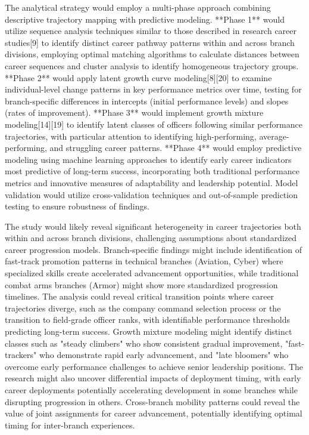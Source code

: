 \documentclass[main.tex]{subfiles}
\begin{document}

The analytical strategy would employ a multi-phase approach combining descriptive trajectory mapping with predictive modeling. **Phase 1** would utilize sequence analysis techniques similar to those described in research career studies[9] to identify distinct career pathway patterns within and across branch divisions, employing optimal matching algorithms to calculate distances between career sequences and cluster analysis to identify homogeneous trajectory groups. **Phase 2** would apply latent growth curve modeling[8][20] to examine individual-level change patterns in key performance metrics over time, testing for branch-specific differences in intercepts (initial performance levels) and slopes (rates of improvement). **Phase 3** would implement growth mixture modeling[14][19] to identify latent classes of officers following similar performance trajectories, with particular attention to identifying high-performing, average-performing, and struggling career patterns. **Phase 4** would employ predictive modeling using machine learning approaches to identify early career indicators most predictive of long-term success, incorporating both traditional performance metrics and innovative measures of adaptability and leadership potential. Model validation would utilize cross-validation techniques and out-of-sample prediction testing to ensure robustness of findings.


The study would likely reveal significant heterogeneity in career trajectories both within and across branch divisions, challenging assumptions about standardized career progression models. Branch-specific findings might include identification of fast-track promotion patterns in technical branches (Aviation, Cyber) where specialized skills create accelerated advancement opportunities, while traditional combat arms branches (Armor) might show more standardized progression timelines. The analysis could reveal critical transition points where career trajectories diverge, such as the company command selection process or the transition to field-grade officer ranks, with identifiable performance thresholds predicting long-term success. Growth mixture modeling might identify distinct classes such as "steady climbers" who show consistent gradual improvement, "fast-trackers" who demonstrate rapid early advancement, and "late bloomers" who overcome early performance challenges to achieve senior leadership positions. The research might also uncover differential impacts of deployment timing, with early career deployments potentially accelerating development in some branches while disrupting progression in others. Cross-branch mobility patterns could reveal the value of joint assignments for career advancement, potentially identifying optimal timing for inter-branch experiences.
\end{document}
